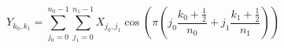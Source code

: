 \documentclass[a4paper, 12pt]{article}
\begin{document}
\begin{equation*}
Y_{k_0,k_1} = \sum\limits_{j_0=0}^{n_0-1} \sum\limits_{j_1=0}^{n_1-1} X_{j_0,j_1} \cos \left( \pi \left( j_0 \frac{k_0 + \frac{1}{2}}{n_0} + j_1 \frac{k_1 + \frac{1}{2}}{n_1} \right)  \right)
\end{equation*}
\end{document}
